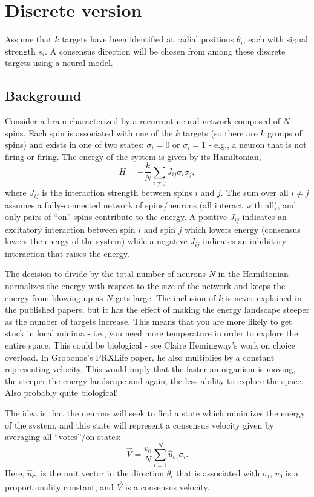 \documentclass[12pt]{article}
\begin{document}
	
\section*{Discrete version}
Assume that $k$ targets have been identified at radial positions $\theta_i$, each with signal strength $s_i$. A consensus direction will be chosen from among these discrete targets using a neural model.

\subsection*{Background}
Consider a brain characterized by a recurrent neural network composed of $N$ spins. Each spin is associated with one of the $k$ targets (so there are $k$ groups of spins) and exists in one of two states: $\sigma_i=0$ or $\sigma_i=1$ - e.g., a neuron that is not firing or firing. The energy of the system is given by its Hamiltonian,
\[
H = -\frac{k}{N}\sum_{i\neq j}J_{ij}\sigma_i\sigma_j,
\]
where $J_{ij}$ is the interaction strength between spins $i$ and $j$. The sum over all $i\neq j$ assumes a fully-connected network of spins/neurons (all interact with all), and only pairs of ``on'' spins contribute to the energy. A positive $J_{ij}$ indicates an excitatory interaction between spin $i$ and spin $j$ which lowers energy (consensus lowers the energy of the system) while a negative $J_{ij}$ indicates an inhibitory interaction that raises the energy.

The decision to divide by the total number of neurons $N$ in the Hamiltonian normalizes the energy with respect to the size of the network and keeps the energy from blowing up as $N$ gets large. The inclusion of $k$ is never explained in the published papers, but it has the effect of making the energy landscape steeper as the number of targets increase. This means that you are more likely to get stuck in local minima - i.e., you need more temperature in order to explore the entire space. This could be biological - see Claire Hemingway's work on choice overload. In Grobonos's PRXLife paper, he also multiplies by a constant representing velocity. This would imply that the faster an organism is moving, the steeper the energy landscape and again, the less ability to explore the space. Also probably quite biological! 

The idea is that the neurons will seek to find a state which minimizes the energy of the system, and this state will represent a consensus velocity given by averaging all ``votes''/on-states:
\[
\vec{V} = \frac{v_0}{N}\sum_{i=1}^{N}\hat{u}_{\sigma_i}\sigma_i.
\]
Here, $\hat{u}_{\sigma_i}$ is the unit vector in the direction $\theta_i$ that is associated with $\sigma_i$, $v_0$ is a proportionality constant, and $\vec{V}$ is a consensus velocity.
\end{document}

